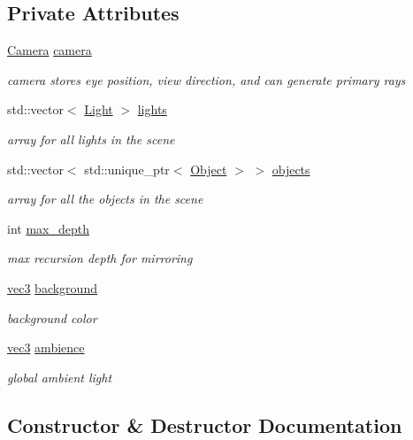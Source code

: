 \subsection*{Private Attributes}
\begin{DoxyCompactItemize}
\item 
\hyperlink{classCamera}{Camera} \hyperlink{classScene_afed13ec4ba2d7ab75b273d507911b498}{camera}
\begin{DoxyCompactList}\small\item\em camera stores eye position, view direction, and can generate primary rays \end{DoxyCompactList}\item 
std\+::vector$<$ \hyperlink{structLight}{Light} $>$ \hyperlink{classScene_ab3625e4ac3c6e47156edd23e2421e828}{lights}
\begin{DoxyCompactList}\small\item\em array for all lights in the scene \end{DoxyCompactList}\item 
std\+::vector$<$ std\+::unique\+\_\+ptr$<$ \hyperlink{structObject}{Object} $>$ $>$ \hyperlink{classScene_abbd6f5b3a4639c3b089037519085bf86}{objects}
\begin{DoxyCompactList}\small\item\em array for all the objects in the scene \end{DoxyCompactList}\item 
int \hyperlink{classScene_a9150039f4d2c46a617b51c7920142d52}{max\+\_\+depth}
\begin{DoxyCompactList}\small\item\em max recursion depth for mirroring \end{DoxyCompactList}\item 
\hyperlink{classvec3}{vec3} \hyperlink{classScene_ab2f20cf753edf2f92fec9b1ad7c9b93e}{background}
\begin{DoxyCompactList}\small\item\em background color \end{DoxyCompactList}\item 
\hyperlink{classvec3}{vec3} \hyperlink{classScene_a8809b5fcac40d60ab499e90f8ae592b3}{ambience}
\begin{DoxyCompactList}\small\item\em global ambient light \end{DoxyCompactList}\end{DoxyCompactItemize}


\subsection{Constructor \& Destructor Documentation}
